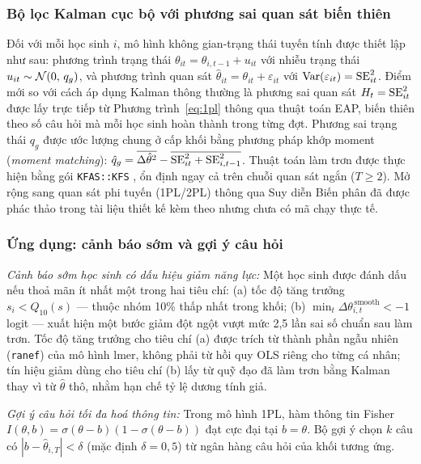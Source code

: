 \subsubsection{Bộ lọc Kalman cục bộ với phương sai quan sát biến thiên}

Đối với mỗi học sinh \(i\), mô hình không gian-trạng thái tuyến tính được thiết lập như sau: phương trình trạng thái \(\theta_{it} = \theta_{i,t-1} + u_{it}\) với nhiễu trạng thái \(u_{it} \sim \mathcal{N}(0,\, q_g)\), và phương trình quan sát \(\hat{\theta}_{it} = \theta_{it} + \varepsilon_{it}\) với \(\mathrm{Var}(\varepsilon_{it}) = \mathrm{SE}_{it}^{2}\). Điểm mới so với cách áp dụng Kalman thông thường là phương sai quan sát \(H_t = \mathrm{SE}_{it}^2\) được lấy trực tiếp từ Phương trình~\eqref{eq:1pl} thông qua thuật toán EAP, biến thiên theo số câu hỏi mà mỗi học sinh hoàn thành trong từng đợt. Phương sai trạng thái \(q_g\) được ước lượng chung ở cấp khối bằng phương pháp khớp moment (\emph{moment matching}): \(\hat q_g = \overline{\Delta\hat{\theta}^2} - \overline{\mathrm{SE}_{it}^2 + \mathrm{SE}_{i,t-1}^2}\). Thuật toán làm trơn được thực hiện bằng gói \texttt{KFAS::KFS} \cite{helske2017}, ổn định ngay cả trên chuỗi quan sát ngắn (\(T \ge 2\)). Mở rộng sang quan sát phi tuyến (1PL/2PL) thông qua Suy diễn Biến phân đã được phác thảo trong tài liệu thiết kế kèm theo nhưng chưa có mã chạy thực tế.

\subsubsection{Ứng dụng: cảnh báo sớm và gợi ý câu hỏi}

\textit{Cảnh báo sớm học sinh có dấu hiệu giảm năng lực:} Một học sinh được đánh dấu nếu thoả mãn ít nhất một trong hai tiêu chí: (a) tốc độ tăng trưởng \(s_i < Q_{10}(s)\) --- thuộc nhóm 10\% thấp nhất trong khối; (b) \(\min_t \Delta\theta_{i,t}^{\,\mathrm{smooth}} < -1\) logit --- xuất hiện một bước giảm đột ngột vượt mức 2,5 lần sai số chuẩn sau làm trơn. Tốc độ tăng trưởng cho tiêu chí (a) được trích từ thành phần ngẫu nhiên (\texttt{ranef}) của mô hình lmer, không phải từ hồi quy OLS riêng cho từng cá nhân; tín hiệu giảm dùng cho tiêu chí (b) lấy từ quỹ đạo đã làm trơn bằng Kalman thay vì từ \(\hat\theta\) thô, nhằm hạn chế tỷ lệ dương tính giả.

\textit{Gợi ý câu hỏi tối đa hoá thông tin:} Trong mô hình 1PL, hàm thông tin Fisher \(I(\theta,b) = \sigma(\theta-b)(1-\sigma(\theta-b))\) đạt cực đại tại \(b = \theta\). Bộ gợi ý chọn \(k\) câu có \(|b - \hat{\theta}_{i,T}| < \delta\) (mặc định \(\delta = 0{,}5\)) từ ngân hàng câu hỏi của khối tương ứng.

